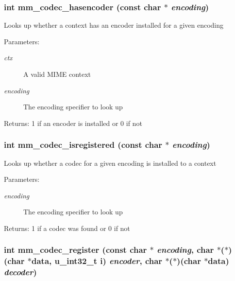 \subsubsection{\setlength{\rightskip}{0pt plus 5cm}int mm\_\-codec\_\-hasencoder (const char $\ast$ {\em encoding})}\label{group__codecs_g50ff257b794ceaec7aedf9ae18bfcc57}


Looks up whether a context has an encoder installed for a given encoding

\begin{Desc}
\item[Parameters:]
\begin{description}
\item[{\em ctx}]A valid MIME context \item[{\em encoding}]The encoding specifier to look up \end{description}
\end{Desc}
\begin{Desc}
\item[Returns:]1 if an encoder is installed or 0 if not \end{Desc}
\subsubsection{\setlength{\rightskip}{0pt plus 5cm}int mm\_\-codec\_\-isregistered (const char $\ast$ {\em encoding})}\label{group__codecs_g9e19f6343128fd7e4ec57c3d55049b55}


Looks up whether a codec for a given encoding is installed to a context

\begin{Desc}
\item[Parameters:]
\begin{description}
\item[{\em encoding}]The encoding specifier to look up \end{description}
\end{Desc}
\begin{Desc}
\item[Returns:]1 if a codec was found or 0 if not \end{Desc}
\subsubsection{\setlength{\rightskip}{0pt plus 5cm}int mm\_\-codec\_\-register (const char $\ast$ {\em encoding}, char $\ast$($\ast$)(char $\ast$data, u\_\-int32\_\-t i) {\em encoder}, char $\ast$($\ast$)(char $\ast$data) {\em decoder})}\label{group__codecs_gf97a7311c909888ed9f6f14d6f1bf397}


